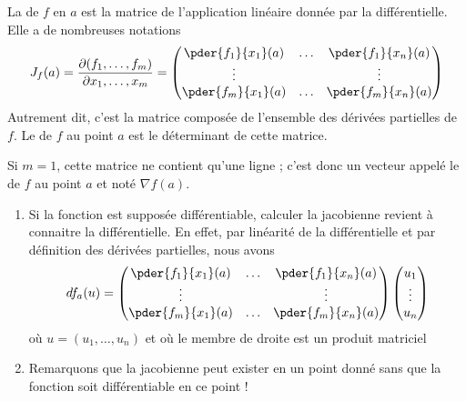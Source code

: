 \begin{definition}
	La  de $f$ en $a$ est la matrice de l'application linéaire donnée par la différentielle. Elle a de nombreuses notations
	\begin{equation}
		J_f(a) = \frac{ \partial (f_1,\ldots, f_m) }{ \partial x_1,\ldots, x_m }=
		\begin{pmatrix}
			\pder {f_1} {x_1}(a) & \ldots & \pder {f_1} {x_n}(a) \\
			\vdots               &        & \vdots               \\
			\pder {f_m} {x_1}(a) & \ldots & \pder {f_m} {x_n}(a)
		\end{pmatrix}
	\end{equation}
	Autrement dit, c'est la matrice composée de l'ensemble des dérivées partielles de $f$. Le  de \( f\) au point \( a\) est le déterminant de cette matrice.

	Si $m = 1$, cette matrice ne contient qu'une ligne ; c'est donc un vecteur appelé le  de $f$ au point $a$ et noté $\nabla f(a)$.
\end{definition}

\begin{remark}
	\begin{enumerate}
		\item Si la fonction est supposée différentiable, calculer la
		      jacobienne revient à connaitre la différentielle. En effet, par
		      linéarité de la différentielle et par définition des dérivées
		      partielles, nous avons
		      \begin{equation*}
			      d f_a (u) =%
			      \begin{pmatrix}
				      \pder {f_1} {x_1}(a) & \ldots & \pder {f_1} {x_n}(a) \\
				      \vdots               &        & \vdots               \\
				      \pder {f_m} {x_1}(a) & \ldots & \pder {f_m} {x_n}(a)
			      \end{pmatrix}
			      \begin{pmatrix}u_1\\\vdots\\u_n\end{pmatrix}
		      \end{equation*}
		      où $u = (u_1, \ldots, u_n)$ et où le membre de droite est un
		      produit matriciel

		\item Remarquons que la jacobienne peut exister en un point donné
		      sans que la fonction soit différentiable en ce point !
	\end{enumerate}
\end{remark}


